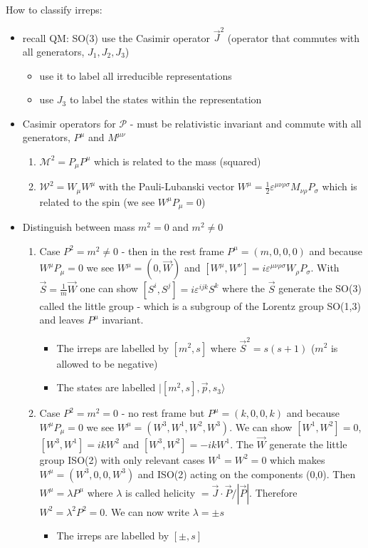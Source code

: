 \documentclass[10pt,a4paper]{book}
\theoremstyle{definition}
\begin{document}
How to classify irreps:
\begin{itemize}
\item recall QM: SO(3) use the Casimir operator $\vec{J}^2$ (operator that commutes with all generators, $J_1, J_2, J_3$) 
\begin{itemize}
\item use it to label all irreducible representations
\item use $J_3$ to label the states within the representation
\end{itemize}  
\item Casimir operators for $\mathcal{P}$ - must be relativistic invariant and commute with all generators, $P^\mu$ and $M^{\mu\nu}$
\begin{enumerate}
\item $\mathcal{M}^2=P_\mu P^\mu$ which is related to the mass (squared)
\item $\mathcal{W}^2=W_\mu W^{\mu}$ with the Pauli-Lubanski vector $W^\mu=\frac{1}{2}\varepsilon^{\mu\nu\rho\sigma}M_{\nu\rho}P_\sigma$ which is related to the spin (we see $W^\mu P_\mu=0$)
\end{enumerate}
\item Distinguish between mass $m^2=0$ and $m^2\neq0$
\begin{enumerate}
\item Case $P^2=m^2\neq0$ - then in the rest frame $P^\mu=(m,0,0,0)$ and because $W^\mu P_\mu=0$ we see $W^\mu=(0,\vec{W})$ and $[W^\mu,W^\nu]=i\varepsilon^{\mu\nu\rho\sigma}W_\rho P_\sigma$. With $\vec{S}=\frac{1}{m}\vec{W}$ one can show $[S^i,S^j]=i\varepsilon^{ijk}S^k$ where the $\vec{S}$ generate the SO(3) called the little group - which is a subgroup of the Lorentz group SO(1,3) and leaves $P^\mu$ invariant.
\begin{itemize}
\item The irreps are labelled by $[m^2,s]$ where $\vec{S}^2=s(s+1)$ ($m^2$ is allowed to be negative)
\item The states are labelled $|[m^2,s],\vec{p},s_3\rangle$
\end{itemize} 


\item Case $P^2=m^2=0$ - no rest frame but $P^\mu=(k,0,0,k)$ and because $W^\mu P_\mu=0$ we see $W^\mu=(W^3,W^1,W^2,W^3)$. We can show $[W^1,W^2]=0$, $[W^3,W^1]=ikW^2$ and $[W^3,W^2]=-ikW^1$. The $\vec{W}$ generate the little group ISO(2) with only relevant cases $W^1=W^2=0$ which makes $W^\mu=(W^3,0,0,W^3)$ and ISO(2) acting on the components (0,0). Then $W^\mu=\lambda P^\mu$ where $\lambda$ is called helicity $=\vec{J}\cdot\vec{P}/|\vec{P}|$. Therefore $W^2=\lambda^2P^2=0$. We can now write $\lambda=\pm s$
\begin{itemize}
\item The irreps are labelled by $[\pm,s]$
\end{itemize}




\end{enumerate}
\end{itemize}
\end{document}
